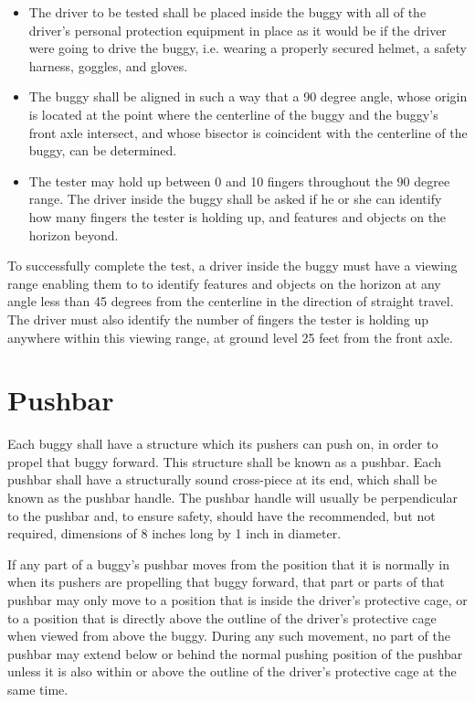 	\begin{itemize}

		\item
		The driver to be tested shall be placed inside the buggy with all of the driver's personal protection equipment in place as it would be if the driver were going to drive the buggy, i.e. wearing a properly secured helmet, a safety harness, goggles, and gloves.

		\item
		The buggy shall be aligned in such a way that a 90 degree angle, whose origin is located at the point where the centerline of the buggy and the buggy's front axle intersect, and whose bisector is coincident with the centerline of the buggy, can be determined.

		\item
		The tester may hold up between 0 and 10 fingers throughout the 90 degree range. The driver inside the buggy shall be asked if he or she can identify how many fingers the tester is holding up, and features and objects on the horizon beyond.

	\end{itemize}

	To successfully complete the test, a driver inside the buggy must have a viewing range enabling them to to identify features and objects on the horizon at any angle less than 45 degrees from the centerline in the direction of straight travel. The driver must also identify the number of fingers the tester is holding up anywhere within this viewing range, at ground level 25 feet from the front axle.

\section{Pushbar}

	Each buggy shall have a structure which its pushers can push on, in order to propel that buggy forward. This structure shall be known as a pushbar. Each pushbar shall have a structurally sound cross-piece at its end, which shall be known as the pushbar handle. The pushbar handle will usually be perpendicular to the pushbar and, to ensure safety, should have the recommended, but not required, dimensions of 8 inches long by 1 inch in diameter.

	If any part of a buggy's pushbar moves from the position that it is normally in when its pushers are propelling that buggy forward, that part or parts of that pushbar may only move to a position that is inside the driver's protective cage, or to a position that is directly above the outline of the driver's protective cage when viewed from above the buggy. During any such movement, no part of the pushbar may extend below or behind the normal pushing position of the pushbar unless it is also within or above the outline of the driver's protective cage at the same time.

